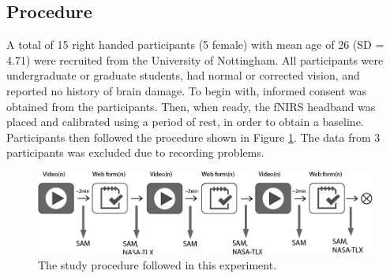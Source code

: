 \documentclass[../main/Feedback.tex]{subfiles}
\begin{document}

\subsection{Procedure}
A total of 15 right handed participants (5 female) with mean age of 26 (SD = 4.71) were recruited from the University of Nottingham.
All participants were undergraduate or graduate students, had normal or corrected vision, and reported no history of brain damage. %
To begin with, informed consent was obtained from the participants. Then, when ready, the fNIRS headband was placed and calibrated using a period of rest, in order to obtain a baseline. Participants then followed the procedure shown in Figure \ref{fig:study-procedure}. The data from 3 participants was excluded due to recording problems.


\begin{figure}[h]
	\centering
	\includegraphics[width=1\linewidth]{../figures/study-procedure}
	\caption[study procedure]{The study procedure followed in this experiment.}
	\label{fig:study-procedure}
\end{figure}
\end{document}
